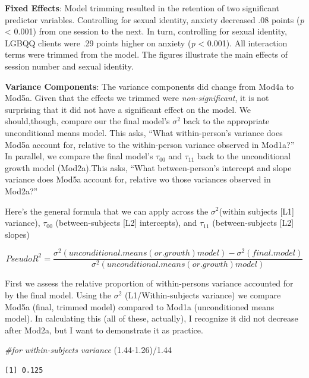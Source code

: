 \documentclass[
  11pt,
]{book}
\newenvironment{Shaded}{\begin{snugshade}}{\end{snugshade}}
\newcommand{\CommentTok}[1]{\textcolor[rgb]{0.56,0.35,0.01}{\textit{#1}}}
\newcommand{\FloatTok}[1]{\textcolor[rgb]{0.00,0.00,0.81}{#1}}
\newcommand{\NormalTok}[1]{#1}
\newcommand{\SpecialCharTok}[1]{\textcolor[rgb]{0.00,0.00,0.00}{#1}}
\begin{document}
\textbf{Fixed Effects}: Model trimming resulted in the retention of two significant predictor variables. Controlling for sexual identity, anxiety decreased .08 points (\emph{p} \textless{} 0.001) from one session to the next. In turn, controlling for sexual identity, LGBQQ clients were .29 points higher on anxiety (\emph{p} \textless{} 0.001). All interaction terms were trimmed from the model. The figures illustrate the main effects of session number and sexual identity.

\textbf{Variance Components}: The variance components did change from Mod4a to Mod5a. Given that the effects we trimmed were \emph{non-significant}, it is not surprising that it did not have a significant effect on the model. We should,though, compare our the final model's \(\sigma ^{2}\) back to the appropriate unconditional means model. This asks, ``What within-person's variance does Mod5a account for, relative to the within-person variance observed in Mod1a?'' In parallel, we compare the final model's \(\tau _{00}\) and \(\tau _{11}\) back to the unconditional growth model (Mod2a).This asks, ``What between-person's intercept and slope variance does Mod5a account for, relative wo those variances observed in Mod2a?''

Here's the general formula that we can apply across the \(\sigma ^{2}\)(within subjects {[}L1{]} variance), \(\tau _{00}\) (between-subjects {[}L2{]} intercepts), and \(\tau _{11}\) (between-subjects {[}L2{]} slopes)

\[Pseudo R^{2} = \frac{\sigma^2 (unconditional. means(or.growth)model) - \sigma^2(final. model)}{\sigma^{2}(unconditional.means(or.growth)model)}\]

First we assess the relative proportion of within-persons variance accounted for by the final model. Using the \(\sigma ^{2}\) (L1/Within-subjects variance) we compare Mod5a (final, trimmed model) compared to Mod1a (unconditioned means model). In calculating this (all of these, actually), I recognize it did not decrease after Mod2a, but I want to demonstrate it as practice.

\begin{Shaded}
\begin{Highlighting}[]
\CommentTok{\#for within{-}subjects variance}
\NormalTok{(}\FloatTok{1.44{-}1.26}\NormalTok{)}\SpecialCharTok{/}\FloatTok{1.44}
\end{Highlighting}
\end{Shaded}

\begin{verbatim}
[1] 0.125
\end{verbatim}
\end{document}
